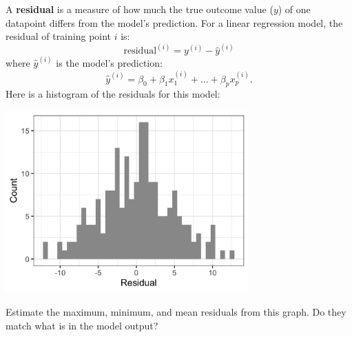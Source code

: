 A \textbf{residual} is a measure of how much the true outcome value ($y$) of one datapoint differs from the model's prediction. For a linear regression model, the residual of training point $i$ is:
$$ \text{residual}^{(i)} = y^{(i)} - \hat{y}^{(i)} $$
where $\hat{y}^{(i)}$ is the model's prediction:
$$ \hat{y}^{(i)} = \beta_0 + \beta_1 x_1^{(i)} + \dots + \beta_p x_p^{(i)}. $$
Here is a histogram of the residuals for this model:
\begin{center}
\includegraphics[width=0.7\textwidth]{img/linreg-example-residuals.png}
\end{center}

\begin{question}{}
Estimate the maximum, minimum, and mean residuals from this graph. Do they match what is in the model output?
\end{question}

